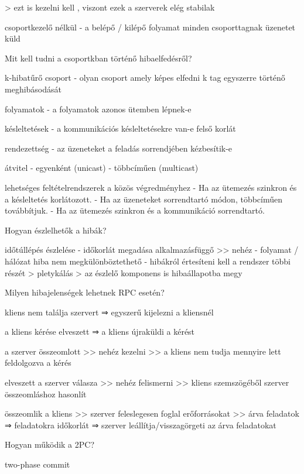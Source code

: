 \documentclass[12pt]{article}
\begin{document}
\begin{description}
        > ezt is kezelni kell , viszont ezek a szerverek elég stabilak
    \item csoportkezelő nélkül
        - a belépő / kilépő folyamat minden csoporttagnak üzenetet küld
    \item  Mit kell tudni a csoportkban történő hibaelfedésről?
    \item k-hibatűrő csoport
        - olyan csoport amely képes elfedni k tag egyszerre történő meghibásodását
    \item folyamatok
        - a folyamatok azonos ütemben lépnek-e
    \item késleltetések
        - a kommunikációs késleltetésekre van-e felső korlát
    \item rendezettség
        - az üzeneteket a feladás sorrendjében kézbesítik-e
    \item átvitel
        - egyenként (unicast)
        - többcíműen (multicast)
    \item lehetséges feltételrendszerek a közös végredményhez 
        - Ha az ütemezés szinkron és a késleltetés korlátozott.
        - Ha az üzeneteket sorrendtartó módon, többcíműen továbbítjuk.
        - Ha az ütemezés szinkron és a kommunikáció sorrendtartó.
    \item  Hogyan észlelhetők a hibák?
    \item időtúllépés észlelése
        - időkorlát megadása alkalmazásfüggő >> nehéz
        - folyamat / hálózat hiba nem megkülönböztethető
        - hibákról értesíteni kell a rendszer többi részét
        > pletykálás
        > az észlelő komponens is hibaállapotba megy
    \item  Milyen hibajelenségek lehetnek RPC esetén?
    \item  kliens nem találja  szervert
        ⇒ egyszerű kijelezni a kliensnél
    \item a kliens kérése elveszett
        ⇒ a kliens újraküldi a kérést
    \item a szerver összeomlott
        >> nehéz kezelni >> a kliens nem tudja mennyire lett feldolgozva a kérés
    \item elveszett a szerver válasza
        >> nehéz felismerni >> kliens szemszögéből szerver összeomláshoz hasonlít
    \item összeomlik a kliens
        >> szerver feleslegesen foglal erőforrásokat >> árva feladatok
        ⇒ feladatokra időkorlát
        ⇒ szerver leállítja/visszagörgeti az árva feladatokat
    \item  Hogyan működik a 2PC?
    \item two-phase commit

\end{description}
\end{document}
